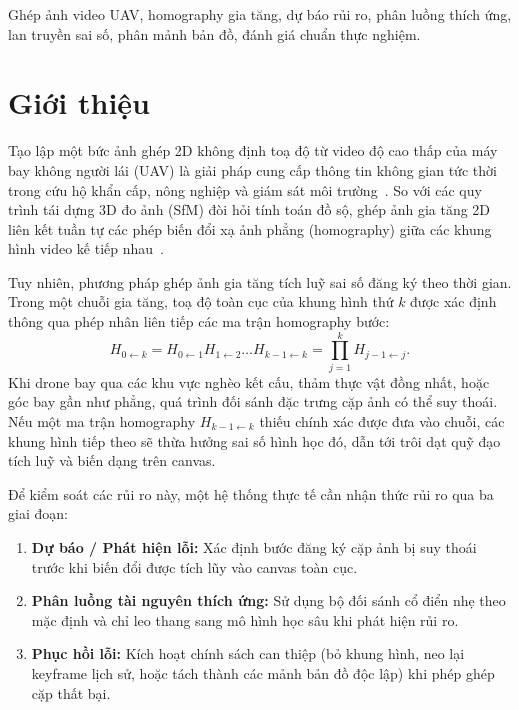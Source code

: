 \documentclass[conference]{IEEEtran}
\begin{document}
\begin{IEEEkeywords}
Ghép ảnh video UAV, homography gia tăng, dự báo rủi ro, phân luồng thích ứng, lan truyền sai số, phân mảnh bản đồ, đánh giá chuẩn thực nghiệm.
\end{IEEEkeywords}

\section{Giới thiệu}
\label{sec:intro}

Tạo lập một bức ảnh ghép 2D không định toạ độ từ video độ cao thấp của máy bay không người lái (UAV) là giải pháp cung cấp thông tin không gian tức thời trong cứu hộ khẩn cấp, nông nghiệp và giám sát môi trường~\cite{hwang2026,li2023}. So với các quy trình tái dựng 3D đo ảnh (SfM) đòi hỏi tính toán đồ sộ, ghép ảnh gia tăng 2D liên kết tuần tự các phép biến đổi xạ ảnh phẳng (homography) giữa các khung hình video kế tiếp nhau~\cite{map2dfusion}.

Tuy nhiên, phương pháp ghép ảnh gia tăng tích luỹ sai số đăng ký theo thời gian. Trong một chuỗi gia tăng, toạ độ toàn cục của khung hình thứ $k$ được xác định thông qua phép nhân liên tiếp các ma trận homography bước:
\begin{equation}
H_{0 \leftarrow k} = H_{0 \leftarrow 1} H_{1 \leftarrow 2} \dots H_{k-1 \leftarrow k} = \prod_{j=1}^k H_{j-1 \leftarrow j}.
\label{eq:chain_accum_vi}
\end{equation}
Khi drone bay qua các khu vực nghèo kết cấu, thảm thực vật đồng nhất, hoặc góc bay gần như phẳng, quá trình đối sánh đặc trưng cặp ảnh có thể suy thoái. Nếu một ma trận homography $H_{k-1 \leftarrow k}$ thiếu chính xác được đưa vào chuỗi, các khung hình tiếp theo sẽ thừa hưởng sai số hình học đó, dẫn tới trôi dạt quỹ đạo tích luỹ và biến dạng trên canvas.

Để kiểm soát các rủi ro này, một hệ thống thực tế cần nhận thức rủi ro qua ba giai đoạn:
\begin{enumerate}
    \item \textbf{Dự báo / Phát hiện lỗi:} Xác định bước đăng ký cặp ảnh bị suy thoái trước khi biến đổi được tích lũy vào canvas toàn cục.
    \item \textbf{Phân luồng tài nguyên thích ứng:} Sử dụng bộ đối sánh cổ điển nhẹ theo mặc định và chỉ leo thang sang mô hình học sâu khi phát hiện rủi ro.
    \item \textbf{Phục hồi lỗi:} Kích hoạt chính sách can thiệp (bỏ khung hình, neo lại keyframe lịch sử, hoặc tách thành các mảnh bản đồ độc lập) khi phép ghép cặp thất bại.
\end{enumerate}
\end{document}
